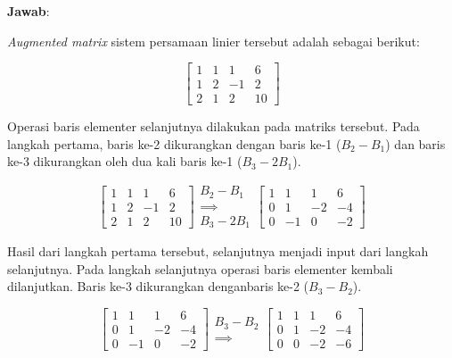 \documentclass[]{book}
\theoremstyle{definition}
\theoremstyle{definition}
\theoremstyle{definition}
\theoremstyle{remark}
\begin{document}
\textbf{Jawab}:

\emph{Augmented matrix} sistem persamaan linier tersebut adalah sebagai berikut:

\[
\begin{bmatrix}
     1 & 1 & 1 & 6     \\[0.3em]
     1 & 2 & -1 & 2     \\[0.3em]
     2 & 1 & 2 & 10
\end{bmatrix}
\]

Operasi baris elementer selanjutnya dilakukan pada matriks tersebut. Pada langkah pertama, baris ke-2 dikurangkan dengan baris ke-1 (\(B_2-B_1\)) dan baris ke-3 dikurangkan oleh dua kali baris ke-1 (\(B_3-2B_1\)).

\begin{equation*}
\begin{bmatrix}
     1 & 1 & 1 & 6     \\[0.3em]
     1 & 2 & -1 & 2     \\[0.3em]
     2 & 1 & 2 & 10
\end{bmatrix}
\begin{matrix}
  B_2-B_1 \\
  \implies \\
  B_3-2B_1
\end{matrix}
\begin{bmatrix}
     1 & 1 & 1 & 6     \\[0.3em]
     0 & 1 & -2 & -4     \\[0.3em]
     0 & -1 & 0 & -2
\end{bmatrix}
\end{equation*}

Hasil dari langkah pertama tersebut, selanjutnya menjadi input dari langkah selanjutnya. Pada langkah selanjutnya operasi baris elementer kembali dilanjutkan. Baris ke-3 dikurangkan denganbaris ke-2 (\(B_3-B_2\)).

\begin{equation*}
\begin{bmatrix}
     1 & 1 & 1 & 6     \\[0.3em]
     0 & 1 & -2 & -4     \\[0.3em]
     0 & -1 & 0 & -2
\end{bmatrix}
\begin{matrix}
  B_3-B_2 \\
  \implies
\end{matrix}
\begin{bmatrix}
     1 & 1 & 1 & 6     \\[0.3em]
     0 & 1 & -2 & -4     \\[0.3em]
     0 & 0 & -2 & -6
\end{bmatrix}
\end{equation*}
\end{document}
